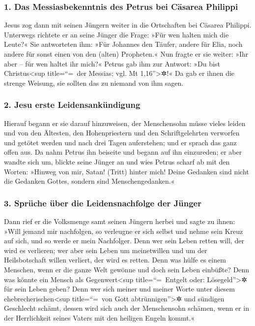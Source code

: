 \hypertarget{das-messiasbekenntnis-des-petrus-bei-cuxe4sarea-philippi}{%
\subsubsection{1. Das Messiasbekenntnis des Petrus bei Cäsarea
Philippi}\label{das-messiasbekenntnis-des-petrus-bei-cuxe4sarea-philippi}}

 Jesus zog dann mit seinen Jüngern weiter in die
Ortschaften bei Cäsarea Philippi. Unterwegs richtete er an seine Jünger
die Frage: »Für wen halten mich die Leute?«  Sie
antworteten ihm: »Für Johannes den Täufer, andere für Elia, noch andere
für sonst einen von den (alten) Propheten.«  Nun fragte
er sie weiter: »Ihr aber -- für wen haltet ihr mich?« Petrus gab ihm zur
Antwort: »Du bist Christus\textless sup title=``=~der Messias; vgl. Mt
1,16''\textgreater✲!«  Da gab er ihnen die strenge
Weisung, sie sollten das zu niemand von ihm sagen.

\hypertarget{jesu-erste-leidensankuxfcndigung}{%
\subsubsection{2. Jesu erste
Leidensankündigung}\label{jesu-erste-leidensankuxfcndigung}}

 Hierauf begann er sie darauf hinzuweisen, der
Menschensohn müsse vieles leiden und von den Ältesten, den
Hohenpriestern und den Schriftgelehrten verworfen und getötet werden und
nach drei Tagen auferstehen;  und er sprach das ganz
offen aus. Da nahm Petrus ihn beiseite und begann auf ihn einzureden;
 er aber wandte sich um, blickte seine Jünger an und wies
Petrus scharf ab mit den Worten: »Hinweg von mir, Satan! (Tritt) hinter
mich! Deine Gedanken sind nicht die Gedanken Gottes, sondern sind
Menschengedanken.«

\hypertarget{spruxfcche-uxfcber-die-leidensnachfolge-der-juxfcnger}{%
\subsubsection{3. Sprüche über die Leidensnachfolge der
Jünger}\label{spruxfcche-uxfcber-die-leidensnachfolge-der-juxfcnger}}

 Dann rief er die Volksmenge samt seinen Jüngern herbei
und sagte zu ihnen: »Will jemand mir nachfolgen, so verleugne er sich
selbst und nehme sein Kreuz auf sich, und so werde er mein Nachfolger.
 Denn wer sein Leben retten will, der wird es verlieren;
wer aber sein Leben um meinetwillen und um der Heilsbotschaft willen
verliert, der wird es retten.  Denn was hülfe es einem
Menschen, wenn er die ganze Welt gewönne und doch sein Leben einbüßte?
 Denn was könnte ein Mensch als Gegenwert\textless sup
title=``=~Entgelt oder: Lösegeld''\textgreater✲ für sein Leben geben?
 Denn wer sich meiner und meiner Worte unter diesem
ehebrecherischen\textless sup title=``=~von Gott
abtrünnigen''\textgreater✲ und sündigen Geschlecht schämt, dessen wird
sich auch der Menschensohn schämen, wenn er in der Herrlichkeit seines
Vaters mit den heiligen Engeln kommt.«

